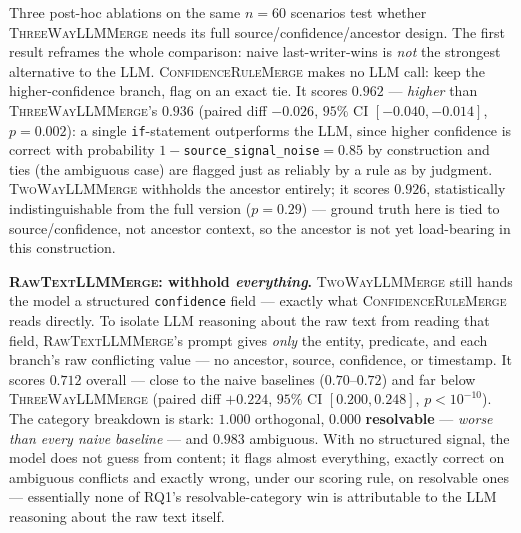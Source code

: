 \documentclass[11pt]{article}
\begin{document}
Three post-hoc ablations on the same $n{=}60$ scenarios test whether
\textsc{ThreeWayLLMMerge} needs its full source/confidence/ancestor design.
The first result reframes the whole comparison: naive last-writer-wins is
\emph{not} the strongest alternative to the LLM. \textsc{ConfidenceRuleMerge}
makes no LLM call: keep the higher-confidence branch, flag on an exact tie.
It scores $0.962$ --- \emph{higher} than
\textsc{ThreeWayLLMMerge}'s $0.936$ (paired diff $-0.026$, $95\%$ CI
$[-0.040,-0.014]$, $p{=}0.002$): a single \texttt{if}-statement outperforms the
LLM, since higher confidence is correct with probability
$1{-}$\texttt{source\_signal\_noise}${=}0.85$ by construction and ties (the
ambiguous case) are flagged just as reliably by a rule as by judgment.
\textsc{TwoWayLLMMerge} withholds the ancestor entirely; it scores $0.926$,
statistically indistinguishable from the full version ($p{=}0.29$) --- ground
truth here is tied to source/confidence, not ancestor context, so the
ancestor is not yet load-bearing in this construction.

\textbf{\textsc{RawTextLLMMerge}: withhold
\emph{everything}.} \textsc{TwoWayLLMMerge} still hands the model a structured
\texttt{confidence} field --- exactly what \textsc{ConfidenceRuleMerge} reads
directly. To isolate LLM reasoning about the raw text from reading that
field, \textsc{RawTextLLMMerge}'s prompt gives \emph{only} the entity,
predicate, and each branch's raw conflicting value --- no ancestor, source,
confidence, or timestamp. It scores $0.712$ overall --- close to the naive
baselines ($0.70$--$0.72$) and far below \textsc{ThreeWayLLMMerge} (paired
diff $+0.224$, $95\%$ CI $[0.200,0.248]$, $p{<}10^{-10}$). The category
breakdown is stark: $1.000$ orthogonal, $0.000$ \textbf{resolvable} ---
\emph{worse than every naive baseline} --- and $0.983$ ambiguous. With no
structured signal, the model does not guess from content; it flags almost
everything, exactly correct on ambiguous conflicts and exactly wrong, under
our scoring rule, on resolvable ones --- essentially none of RQ1's
resolvable-category win is attributable to the LLM reasoning about the raw
text itself.

\begin{table}[t]
  \centering
  \small
  \caption{Ablations, same $n{=}60$ scenarios; exploratory, post-hoc.
  \textsc{RawTextLLMMerge} added as a later post-hoc check.}
  \label{tab:ablations}
\end{table}
\end{document}
